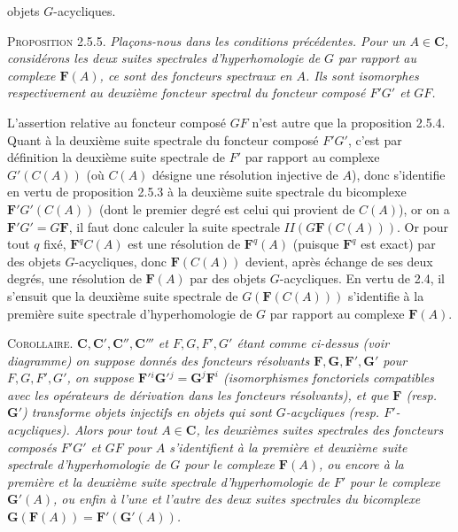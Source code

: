 
\noindent objets $G$-acycliques.

\textsc{Proposition 2.5.5.} \textit{Plaçons-nous dans les
conditions précédentes. Pour un $A\in \mathbf C$, considérons les deux suites
spectrales d'hyperhomologie de $G$ par rapport au complexe $\mathbf F(A)$,
ce sont des foncteurs spectraux en $A$. Ils sont isomorphes respectivement au
deuxième foncteur spectral du foncteur composé $F'G'$ et $GF$.}

L'assertion relative au foncteur composé $GF$ n'est autre que la proposition
2.5.4. Quant à la deuxième suite spectrale du foncteur composé $F'G'$, c'est
par définition la deuxième suite spectrale de $F'$ par rapport au complexe
$G'(C(A))$ (où $C(A)$ désigne une résolution injective de $A$), donc
s'identifie en vertu de proposition 2.5.3 à la deuxième suite spectrale du
bicomplexe $\mathbf F'G'(C(A))$ (dont le premier degré est celui qui provient
de $C(A)$), or on a $\mathbf F'G'=G\mathbf F$, il faut donc calculer la suite
spectrale $II(G\mathbf F(C(A)))$. Or pour tout $q$ fixé,
$\mathbf F^qC(A)$ est une résolution de $\mathbf F^q(A)$ (puisque
$\mathbf F^q$ est exact) par des objets $G$-acycliques, donc
$\mathbf F(C(A))$ devient, après échange de ses deux degrés, une résolution
de $\mathbf F(A)$ par des objets $G$-acycliques. En vertu de 2.4, il
s'ensuit que la deuxième suite spectrale de $G(\mathbf F(C(A)))$ s'identifie
à la première suite spectrale d'hyperhomologie de $G$ par rapport au complexe
$\mathbf F(A)$.

\textsc{Corollaire.} \textit{$\mathbf C,\mathbf C',\mathbf C'',\mathbf C'''$ et $F,G,F',G'$
étant comme ci-dessus \textup{(}voir diagramme\textup{)} on suppose donnés des foncteurs
résolvants $\mathbf F,\mathbf G,\mathbf F',\mathbf G'$ pour $F,G,F',G'$, on
suppose $\mathbf F'{}^i\mathbf G'{}^j=\mathbf G^j\mathbf F^i$ \textup{(}isomorphismes fonctoriels
compatibles avec les opérateurs de dérivation dans les foncteurs résolvants\textup{)},
et que $\mathbf F$ \textup{(}resp. $\mathbf G'$\textup{)} transforme objets injectifs en objets qui sont
$G$-acycliques \textup{(}resp. $F'$-acycliques\textup{)}. Alors pour tout $A\in \mathbf C$, les
deuxièmes suites spectrales des foncteurs composés $F'G'$ et $GF$ pour $A$
s'identifient à la première et deuxième suite spectrale d'hyperhomologie de
$G$ pour le complexe $\mathbf F(A)$, ou encore à la première et la deuxième
suite spectrale d'hyperhomologie de $F'$ pour le complexe $\mathbf G'(A)$, ou
enfin à l'une et l'autre des deux suites spectrales du bicomplexe
$\mathbf G(\mathbf F(A))=\mathbf F'(\mathbf G'(A))$.}

